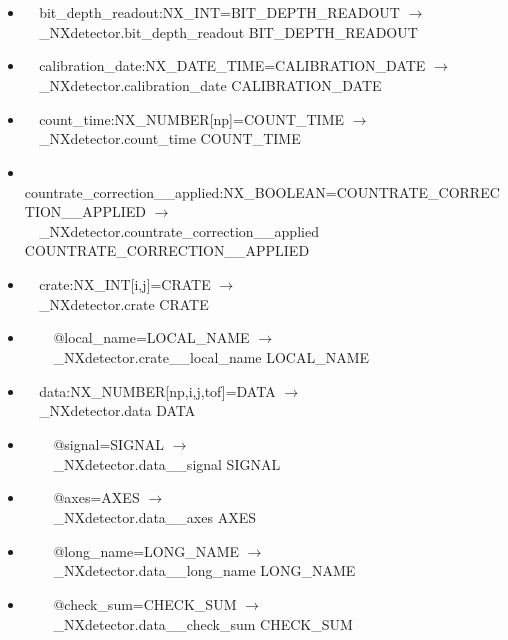 \documentclass[11pt]{article}
\begin{document}
{{\begin{itemize}
\item{\verb|  |bit\_depth\_readout:NX\_INT=BIT\_DEPTH\_READOUT $\rightarrow$\\
\verb|  |\_NXdetector.bit\_depth\_readout BIT\_DEPTH\_READOUT}

\item{\verb|  |calibration\_date:NX\_DATE\_TIME=CALIBRATION\_DATE $\rightarrow$\\
\verb|  |\_NXdetector.calibration\_date CALIBRATION\_DATE}

\item{\verb|  |count\_time:NX\_NUMBER[np]=COUNT\_TIME $\rightarrow$\\
\verb|  |\_NXdetector.count\_time COUNT\_TIME}

\item{\verb|  |countrate\_correction\_\_applied:NX\_BOOLEAN=COUNTRATE\_CORRECTION\_\_APPLIED $\rightarrow$\\
\verb|  |\_NXdetector.countrate\_correction\_\_applied COUNTRATE\_CORRECTION\_\_APPLIED}

\item{\verb|  |crate:NX\_INT[i,j]=CRATE $\rightarrow$\\
\verb|  |\_NXdetector.crate CRATE}

\item{\verb|    |@local\_name=LOCAL\_NAME $\rightarrow$\\
\verb|    |\_NXdetector.crate\_\_local\_name LOCAL\_NAME}

\item{\verb|  |data:NX\_NUMBER[np,i,j,tof]=DATA $\rightarrow$\\
\verb|  |\_NXdetector.data DATA}

\item{\verb|    |@signal=SIGNAL $\rightarrow$\\
\verb|    |\_NXdetector.data\_\_signal SIGNAL}

\item{\verb|    |@axes=AXES $\rightarrow$\\
\verb|    |\_NXdetector.data\_\_axes AXES}

\item{\verb|    |@long\_name=LONG\_NAME $\rightarrow$\\
\verb|    |\_NXdetector.data\_\_long\_name LONG\_NAME}

\item{\verb|    |@check\_sum=CHECK\_SUM $\rightarrow$\\
\verb|    |\_NXdetector.data\_\_check\_sum CHECK\_SUM}


\end{itemize}}}
\end{document}
